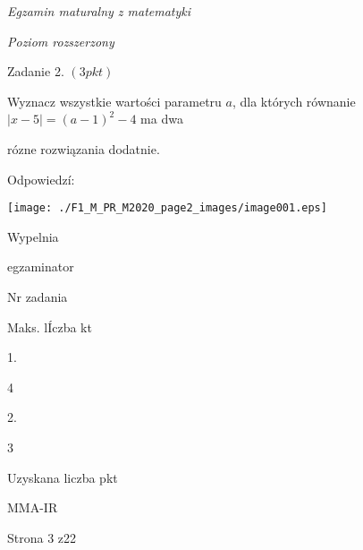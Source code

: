 \documentclass[a4paper,12pt]{article}
\begin{document}
{\it Egzamin maturalny z matematyki}

{\it Poziom rozszerzony}

Zadanie 2. $(3pkt)$

Wyznacz wszystkie wartości parametru $a$, dla których równanie $|x-5|=(a-1)^{2}-4$ ma dwa

rózne rozwiązania dodatnie.

Odpowiedzí:
\begin{center}
\texttt{[image: ./F1\_M\_PR\_M2020\_page2\_images/image001.eps]}
\end{center}
Wypelnia

egzaminator

Nr zadania

Maks. lÍczba kt

1.

4

2.

3

Uzyskana liczba pkt

MMA-IR

Strona 3 z22
\end{document}
